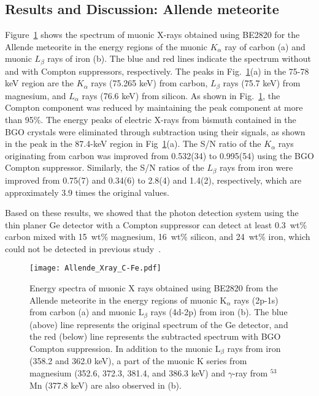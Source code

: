 \subsection{Results and Discussion: Allende meteorite}
Figure~\ref{fig:Allende_Carbon} shows the spectrum of muonic X-rays obtained using BE2820 for the Allende meteorite in the energy regions of the muonic $K_\alpha$ ray of carbon (a) and muonic $L_\beta$ rays of iron (b). %
The blue and red lines indicate the spectrum without and with Compton suppressors, respectively. The peaks in Fig.~\ref{fig:Allende_Carbon}(a) in the 75-78 keV region are the $K_\alpha$ rays (75.265 keV) from carbon, $L_\beta$ rays (75.7 keV) from magnesium, and $L_\alpha$ rays (76.6 keV) from silicon. 
As shown in Fig.~\ref{fig:Allende_Carbon}, the Compton component was reduced by maintaining the peak component at more than 95\%.
The energy peaks of electric X-rays from bismuth contained in the BGO crystals were eliminated through subtraction using their signals, as shown in the peak in the 87.4-keV region in Fig~\ref{fig:Allende_Carbon}(a). 
The S/N ratio of the $K_\alpha$ rays originating from carbon was improved from 0.532(34) to 0.995(54) using the BGO Compton suppressor. 
Similarly, the S/N ratios of the $L_\beta$ rays from iron were improved from 0.75(7) and 0.34(6) to 2.8(4) and 1.4(2), respectively, which are approximately 3.9 times the original values. 

Based on these results, we showed that the photon detection system using the thin planer Ge detector with a Compton suppressor can detect at least 0.3~wt\% carbon %
mixed with 15~wt\% magnesium, 16~wt\% silicon, and 24~wt\% iron, which could not be detected in previous study~\cite{Terada2014-cw}.

\begin{figure}
    \centering
    \texttt{[image: Allende\_Xray\_C-Fe.pdf]}
    \caption{Energy spectra of muonic X rays obtained using BE2820 from the Allende meteorite in the energy regions of muonic K$_\alpha$ rays (2p-1s) from carbon (a) and muonic L$_\beta$ rays (4d-2p) from iron (b). The blue (above) line represents the original spectrum of the Ge detector, and the red (below) line represents the subtracted spectrum with BGO Compton suppression. In addition to the muonic L$_\beta$ rays from iron (358.2 and 362.0 keV), a part of the muonic K series from magnesium (352.6, 372.3, 381.4, and 386.3 keV) and $\gamma$-ray from $^{53}$Mn (377.8 keV) are also observed in (b).}
    \label{fig:Allende_Carbon}
\end{figure}